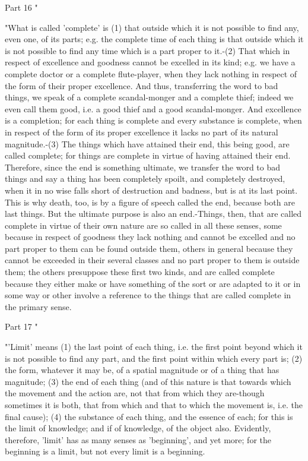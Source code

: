Part 16 "

"What is called 'complete' is (1) that outside which it is not possible
to find any, even one, of its parts; e.g. the complete time of each
thing is that outside which it is not possible to find any time which
is a part proper to it.-(2) That which in respect of excellence and
goodness cannot be excelled in its kind; e.g. we have a complete doctor
or a complete flute-player, when they lack nothing in respect of the
form of their proper excellence. And thus, transferring the word to
bad things, we speak of a complete scandal-monger and a complete thief;
indeed we even call them good, i.e. a good thief and a good scandal-monger.
And excellence is a completion; for each thing is complete and every
substance is complete, when in respect of the form of its proper excellence
it lacks no part of its natural magnitude.-(3) The things which have
attained their end, this being good, are called complete; for things
are complete in virtue of having attained their end. Therefore, since
the end is something ultimate, we transfer the word to bad things
and say a thing has been completely spoilt, and completely destroyed,
when it in no wise falls short of destruction and badness, but is
at its last point. This is why death, too, is by a figure of speech
called the end, because both are last things. But the ultimate purpose
is also an end.-Things, then, that are called complete in virtue of
their own nature are so called in all these senses, some because in
respect of goodness they lack nothing and cannot be excelled and no
part proper to them can be found outside them, others in general because
they cannot be exceeded in their several classes and no part proper
to them is outside them; the others presuppose these first two kinds,
and are called complete because they either make or have something
of the sort or are adapted to it or in some way or other involve a
reference to the things that are called complete in the primary sense.

Part 17 "

"'Limit' means (1) the last point of each thing, i.e. the first point
beyond which it is not possible to find any part, and the first point
within which every part is; (2) the form, whatever it may be, of a
spatial magnitude or of a thing that has magnitude; (3) the end of
each thing (and of this nature is that towards which the movement
and the action are, not that from which they are-though sometimes
it is both, that from which and that to which the movement is, i.e.
the final cause); (4) the substance of each thing, and the essence
of each; for this is the limit of knowledge; and if of knowledge,
of the object also. Evidently, therefore, 'limit' has as many senses
as 'beginning', and yet more; for the beginning is a limit, but not
every limit is a beginning. 

